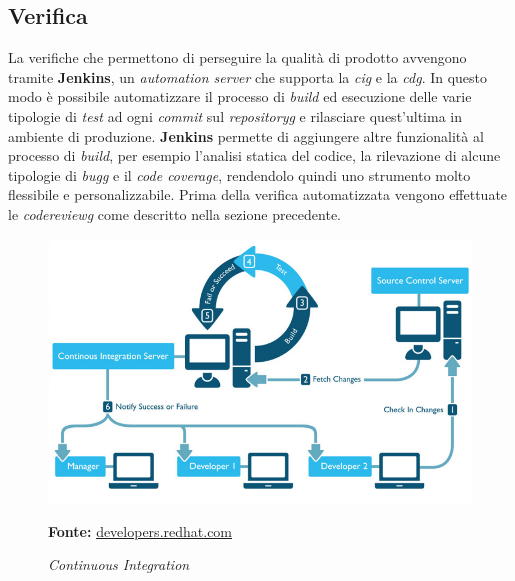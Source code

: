 \newpage

\subsection{Verifica}\label{sec:verifica}
    La verifiche che permettono di perseguire la qualità di prodotto avvengono tramite \textbf{Jenkins}, un \textit{automation server} che supporta la \textit{\gls{cig}} e la \textit{\gls{cdg}}.
    In questo modo è possibile automatizzare il processo di \textit{build} ed esecuzione delle varie tipologie di \textit{test} ad ogni \textit{commit} sul \textit{\gls{repositoryg}} e rilasciare quest'ultima in ambiente di produzione.
    \textbf{Jenkins} permette di aggiungere altre funzionalità al processo di \textit{build}, per esempio l'analisi statica del codice, la rilevazione di alcune tipologie di \textit{\gls{bugg}} e il \textit{code coverage}, rendendolo quindi uno strumento molto flessibile e personalizzabile.
    Prima della verifica automatizzata vengono effettuate le \textit{\gls{codereviewg}} come descritto nella sezione precedente.
    

    \begin{figure}[ht]
        \centering
        \includegraphics[width=1\textwidth]{immagini/ci.png}
        \caption{\textit{Continuous Integration}}
        \textbf{Fonte:} \href{https://developers.redhat.com/blog/2017/09/06/continuous-integration-a-typical-process/}{developers.redhat.com}
        \label{fig: Continuous Integration}
    \end{figure}
